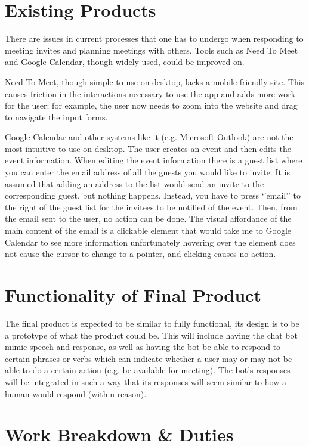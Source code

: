 \documentclass{sigchi}
\begin{document}
\section{Existing Products}

There are issues in current processes that one has to undergo when responding to meeting invites and planning meetings with others. Tools such as Need To Meet and Google Calendar, though widely used, could be improved on.

Need To Meet, though simple to use on desktop, lacks a mobile friendly site. This causes friction in the interactions necessary to use the app and adds more work for the user; for example, the user now needs to zoom into the website and drag to navigate the input forms. 

Google Calendar and other systems like it (e.g. Microsoft Outlook) are not the most intuitive to use on desktop. The user creates an event and then edits the event information. When editing the event information there is a guest list where you can enter the email address of all the guests you would like to invite. It is assumed that adding an address to the list would send an invite to the corresponding guest, but nothing happens. Instead, you have to press `'email'' to the right of the guest list for the invitees to be notified of the event. Then, from the email sent to the user, no action can be done. The visual affordance of the main content of the email is a clickable element that would take me to Google Calendar to see more information \textemdash unfortunately hovering over the element does not cause the cursor to change to a pointer, and clicking causes no action. 


\section{Functionality of Final Product}

The final product is expected to be similar to fully functional, 
its design is to be a prototype of what the product could be. This 
will include having the chat bot mimic speech and response, as 
well as having the bot be able to respond to certain phrases or
verbs which can indicate whether a user may or may not be able to do a certain action (e.g. be available for meeting). The bot's responses will be integrated in such a way that its responses will seem similar to how a human would respond (within reason).

\section{Work Breakdown \& Duties}
\end{document}

